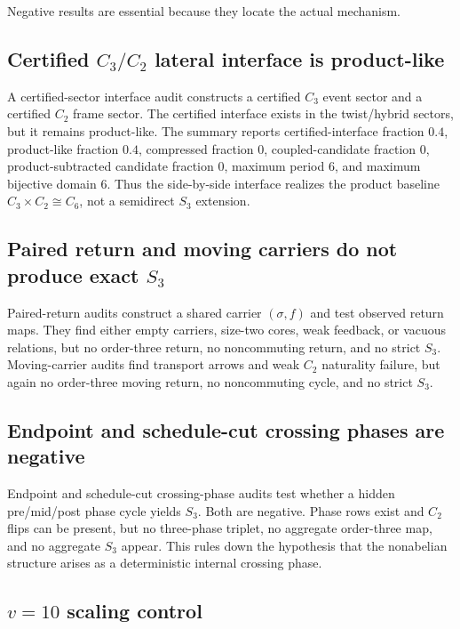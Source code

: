 \documentclass[11pt]{article}
\begin{document}
Negative results are essential because they locate the actual mechanism.

\subsection{Certified $C_3/C_2$ lateral interface is product-like}

A certified-sector interface audit constructs a certified $C_3$ event sector and a certified $C_2$ frame sector.  The certified interface exists in the twist/hybrid sectors, but it remains product-like.  The summary reports certified-interface fraction $0.4$, product-like fraction $0.4$, compressed fraction $0$, coupled-candidate fraction $0$, product-subtracted candidate fraction $0$, maximum period $6$, and maximum bijective domain $6$.  Thus the side-by-side interface realizes the product baseline $C_3\times C_2\cong C_6$, not a semidirect $S_3$ extension.

\subsection{Paired return and moving carriers do not produce exact $S_3$}

Paired-return audits construct a shared carrier $(\sigma,f)$ and test observed return maps.  They find either empty carriers, size-two cores, weak feedback, or vacuous relations, but no order-three return, no noncommuting return, and no strict $S_3$.  Moving-carrier audits find transport arrows and weak $C_2$ naturality failure, but again no order-three moving return, no noncommuting cycle, and no strict $S_3$.

\subsection{Endpoint and schedule-cut crossing phases are negative}

Endpoint and schedule-cut crossing-phase audits test whether a hidden pre/mid/post phase cycle yields $S_3$.  Both are negative.  Phase rows exist and $C_2$ flips can be present, but no three-phase triplet, no aggregate order-three map, and no aggregate $S_3$ appear.  This rules down the hypothesis that the nonabelian structure arises as a deterministic internal crossing phase.

\subsection{$v=10$ scaling control}
\end{document}
